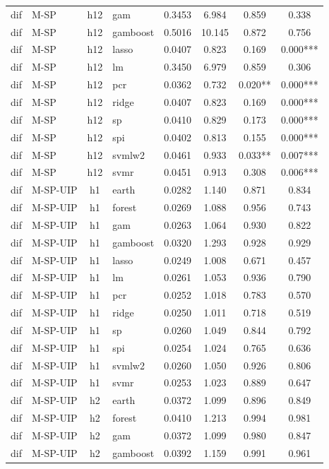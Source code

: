 \begin{ThreePartTable}
\begin{longtable}[t]{llclcccc}
dif & M-SP & h12 & gam & 0.3453 & 6.984 & 0.859 & 0.338\\
dif & M-SP & h12 & gamboost & 0.5016 & 10.145 & 0.872 & 0.756\\
dif & M-SP & h12 & lasso & 0.0407 & 0.823 & 0.169 & 0.000***\\
dif & M-SP & h12 & lm & 0.3450 & 6.979 & 0.859 & 0.306\\
dif & M-SP & h12 & pcr & 0.0362 & 0.732 & 0.020** & 0.000***\\
dif & M-SP & h12 & ridge & 0.0407 & 0.823 & 0.169 & 0.000***\\
dif & M-SP & h12 & sp & 0.0410 & 0.829 & 0.173 & 0.000***\\
dif & M-SP & h12 & spi & 0.0402 & 0.813 & 0.155 & 0.000***\\
dif & M-SP & h12 & svmlw2 & 0.0461 & 0.933 & 0.033** & 0.007***\\
dif & M-SP & h12 & svmr & 0.0451 & 0.913 & 0.308 & 0.006***\\
\addlinespace
dif & M-SP-UIP & h1 & earth & 0.0282 & 1.140 & 0.871 & 0.834\\
dif & M-SP-UIP & h1 & forest & 0.0269 & 1.088 & 0.956 & 0.743\\
dif & M-SP-UIP & h1 & gam & 0.0263 & 1.064 & 0.930 & 0.822\\
dif & M-SP-UIP & h1 & gamboost & 0.0320 & 1.293 & 0.928 & 0.929\\
dif & M-SP-UIP & h1 & lasso & 0.0249 & 1.008 & 0.671 & 0.457\\
dif & M-SP-UIP & h1 & lm & 0.0261 & 1.053 & 0.936 & 0.790\\
dif & M-SP-UIP & h1 & pcr & 0.0252 & 1.018 & 0.783 & 0.570\\
dif & M-SP-UIP & h1 & ridge & 0.0250 & 1.011 & 0.718 & 0.519\\
dif & M-SP-UIP & h1 & sp & 0.0260 & 1.049 & 0.844 & 0.792\\
dif & M-SP-UIP & h1 & spi & 0.0254 & 1.024 & 0.765 & 0.636\\
dif & M-SP-UIP & h1 & svmlw2 & 0.0260 & 1.050 & 0.926 & 0.806\\
dif & M-SP-UIP & h1 & svmr & 0.0253 & 1.023 & 0.889 & 0.647\\
\addlinespace
dif & M-SP-UIP & h2 & earth & 0.0372 & 1.099 & 0.896 & 0.849\\
dif & M-SP-UIP & h2 & forest & 0.0410 & 1.213 & 0.994 & 0.981\\
dif & M-SP-UIP & h2 & gam & 0.0372 & 1.099 & 0.980 & 0.847\\
dif & M-SP-UIP & h2 & gamboost & 0.0392 & 1.159 & 0.991 & 0.961\\

\end{longtable}
\end{ThreePartTable}
